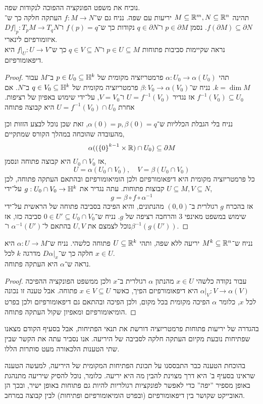 \question{}
\subquestion{}
נוכיח את משפט הפונקציה ההפוכה לנקודות שפה. \\
תהינה $M \subseteq \mathbb{R}^m, N \subseteq \mathbb{R}^n$ יריעות עם שפה.
נניח גם ש־$f : M \to N$ העתקה חלקה כך ש־$f(\partial M) \subseteq \partial N$.
נסמן $p \in \partial M$ ו־$q \in \partial N$ נקודות כך ש־$f(p) = q$ ו־$D f |_p : T_p M \to T_q N$ איזומורפיזם לינארי. \\
נראה שקיימות סביבות פתוחות $p \in U \subseteq M$ ו־$q \in V \subseteq N$ כך ש־$f |_U : U \to V$ היא דיפאומורפיזם.
\begin{proof}
	תהי $\alpha : U_0 \to \alpha(U_0)$ פרמטריזציה מקומית של $p \in U_0 \subseteq \mathbb{H}^k$ ב־$M$ עבור $k = \dim M$.
	נניח ש־$\beta : V_0 \to \alpha(V_0)$ פרמטריזציה מקומית של $q \in V_0 \subseteq \mathbb{H}^k$ ב־$N$.
	אם $f^{-1}(V_0) \subseteq U_0$ אז נגדיר $U = f^{-1}(V_0)$ ו־$V = V_0$, על־ידי שימוש באפיון של רציפות.
	אחרת $U = f^{-1}(V_0) \cap U_0$ היא קבוצה פתוחה 

	נניח בלי הגבלת הכלליות ש־$\alpha(0) = p, \beta(0) = q$, זאת שכן נוכל לבצע הזזות וכן מהעובדה שהוכחה במהלך הקורס שמתקיים,
	\[
		\alpha(({\{ 0 \}}^{k - 1} \times \mathbb{R}) \cap U_0) \subseteq \partial M
	\]
	אז $U_0 \cap V_0$ היא קבוצה פתוחה ונסמן,
	\[
		U = \alpha(U_0 \cap V_0),
		\quad
		V = \beta(U_0 \cap V_0)
	\]
	כל פרמטריזציה מקומית היא דיפאומורפיזם ולכן הומיאומורפיזם ובהתאם העתקה פתוחה, לכן $U \subseteq M, V \subseteq N$ קבוצות פתוחות.
	עתה נגדיר את $g : U_0 \cap V_0 \to \mathbb{H}^k$ על־ידי,
	\[
		g = \beta \circ f \circ \alpha^{-1}
	\]
	אז בהכרח $g$ רגולרית ב־$(0, 0)$ מהנתונים, והיא הפיכה בסביבה פתוחה של הראשית על־ידי שימוש במשפט מאינפי 3 והרחבה רציפה של $g$.
	נניח ש־$0 \in U' \subseteq U_0 \cap V_0$ סביבה כזו, אז נוכל לצמצם את $U, V$ בהתאם ל־$\alpha^{-1}(U')$ ו־$\beta^{-1}(g(U'))$.
\end{proof}

\subquestion{}
נניח ש־$M^k \subseteq \mathbb{R}^n$ יריעה ללא שפה,
ותהי $U \subseteq \mathbb{R}^k$ פתוחה כלשהי.
נניח ש־$\alpha : U \to M$ היא חלקה כך ש־$D \alpha |_x$  מדרגה $k$ לכל $x \in U$. \\
נראה ש־$\alpha$ היא העתקה פתוחה.
\begin{proof}
	עבור נקודה כלשהי $x \in U$ מהנתון $\alpha$ רגולרית ב־$x$ ולכן ממשפט הפונקציה ההפיכה $\alpha |_V : V \to \alpha(V)$ היא דיפאומורפיזם הפיך, כאשר $x \in V \subseteq U$ פתוחה.
	אבל טענה זו נכונה לכל $x$, כלומר $\alpha$ הפיכה מקומית בכל מקום, ולכן הפיכה ובהתאם גם דיפאומורפיזם ולכן בפרט הומיאומורפיזם ומאפיון שקול העתקה פתוחה.
\end{proof}

\subquestion{}
בהגדרה של יריעות פתוחות פרמטריזציה דורשת את תנאי הפתיחות, אבל בסעיף הקודם מצאנו שפתיחות נובעת מקיום העתקה חלקה לסביבה של היריעה.
אנו נסביר עתה את הקשר שבין שתי הטענות הלכאורה מעט סותרות הללו.
\begin{solution}
	בהוכחת הטענה כבר התבססנו על תכונת הפתיחות המקומית של היריעה, למעשה הטענה שראינו בסעיף ב' היא דרך מצוינת להבין מה היא יריעה.
	כלומר, נוכל להסיק שיריעה מתנהגת באופן מספיר ''יפה'' כדי לאפשר לפונקציות רגולריות להיות גם פתוחות באופן ישיר, ובכך הן האובייקט שקושר בין דיפאומורפיזם (ובפרט הומיאומורפיזם ופתיחות) לבין קבוצה במרחב.
\end{solution}


